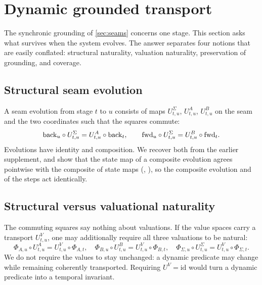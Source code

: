 \section{Dynamic grounded transport}\label{sec:dynamic}

The synchronic grounding of \cref{sec:seams} concerns one stage. This section asks what survives when the system evolves. The answer separates four notions that are easily conflated: structural naturality, valuation naturality, preservation of grounding, and coverage.

\subsection{Structural seam evolution}
A seam evolution from stage $t$ to $u$ consists of maps $U^\Sigma_{t,u}$, $U^A_{t,u}$, $U^B_{t,u}$ on the seam and the two coordinates such that the squares commute:
\[
\mathrm{back}_u \circ U^\Sigma_{t,u} = U^A_{t,u} \circ \mathrm{back}_t, \qquad
\mathrm{fwd}_u \circ U^\Sigma_{t,u} = U^B_{t,u} \circ \mathrm{fwd}_t.
\]
Evolutions have identity and composition. We recover both from the earlier supplement, and show that the state map of a composite evolution agrees pointwise with the composite of state maps (, ), so the composite evolution and  of the steps act identically.

\subsection{Structural versus valuational naturality}
The commuting squares say nothing about valuations. If the value spaces carry a transport $U^V_{t,u}$, one may additionally require all three valuations to be natural:
\[
\Phi_{A,u} \circ U^A_{t,u} = U^V_{t,u} \circ \Phi_{A,t}, \quad
\Phi_{B,u} \circ U^B_{t,u} = U^V_{t,u} \circ \Phi_{B,t}, \quad
\Phi_{\Sigma,u} \circ U^\Sigma_{t,u} = U^V_{t,u} \circ \Phi_{\Sigma,t}.
\]
We do not require the values to stay unchanged: a dynamic predicate may change while remaining coherently transported. Requiring $U^V = \mathrm{id}$ would turn a dynamic predicate into a temporal invariant.

